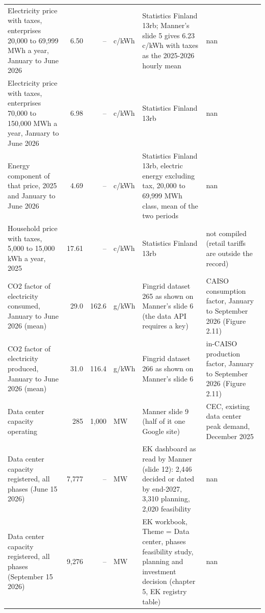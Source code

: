 \begin{tabular}{p{4.6cm}rrlp{5.2cm}p{4.0cm}}
Electricity price with taxes, enterprises 20,000 to 69,999 MWh a year, January to June 2026 & 6.50 & -- & c/kWh & Statistics Finland 13rb; Manner's slide 5 gives 6.23 c/kWh with taxes as the 2025-2026 hourly mean & nan \\
Electricity price with taxes, enterprises 70,000 to 150,000 MWh a year, January to June 2026 & 6.98 & -- & c/kWh & Statistics Finland 13rb & nan \\
Energy component of that price, 2025 and January to June 2026 & 4.69 & -- & c/kWh & Statistics Finland 13rb, electric energy excluding tax, 20,000 to 69,999 MWh class, mean of the two periods & nan \\
Household price with taxes, 5,000 to 15,000 kWh a year, 2025 & 17.61 & -- & c/kWh & Statistics Finland 13rb & not compiled (retail tariffs are outside the record) \\
CO2 factor of electricity consumed, January to June 2026 (mean) & 29.0 & 162.6 & g/kWh & Fingrid dataset 265 as shown on Manner's slide 6 (the data API requires a key) & CAISO consumption factor, January to September 2026 (Figure 2.11) \\
CO2 factor of electricity produced, January to June 2026 (mean) & 31.0 & 116.4 & g/kWh & Fingrid dataset 266 as shown on Manner's slide 6 & in-CAISO production factor, January to September 2026 (Figure 2.11) \\
Data center capacity operating & 285 & 1,000 & MW & Manner slide 9 (half of it one Google site) & CEC, existing data center peak demand, December 2025 \\
Data center capacity registered, all phases (June 15 2026) & 7,777 & -- & MW & EK dashboard as read by Manner (slide 12): 2,446 decided or dated by end-2027, 3,310 planning, 2,020 feasibility & nan \\
Data center capacity registered, all phases (September 15 2026) & 9,276 & -- & MW & EK workbook, Theme = Data center, phases feasibility study, planning and investment decision (chapter 5, EK registry table) & nan \\
\bottomrule
\end{tabular}